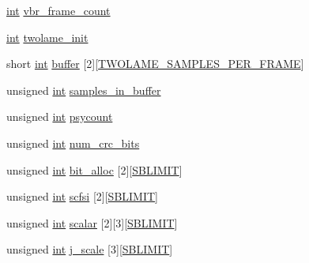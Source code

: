 \begin{DoxyCompactItemize}
\hyperlink{xmltok_8h_a5a0d4a5641ce434f1d23533f2b2e6653}{int} \hyperlink{structtwolame__options__struct_ab9e79c1f1ef2b4cedca215aaeb77a4b2}{vbr\+\_\+frame\+\_\+count}
\item 
\hyperlink{xmltok_8h_a5a0d4a5641ce434f1d23533f2b2e6653}{int} \hyperlink{structtwolame__options__struct_a205bb93e39b37ed46fddf5bbca9fdfc4}{twolame\+\_\+init}
\item 
short \hyperlink{xmltok_8h_a5a0d4a5641ce434f1d23533f2b2e6653}{int} \hyperlink{structtwolame__options__struct_a032502082a28f2c52a3d7eaafff3bb7b}{buffer} \mbox{[}2\mbox{]}\mbox{[}\hyperlink{twolame_8h_a09bd4a4970ba3c49e9f1327daefeb8c1}{T\+W\+O\+L\+A\+M\+E\+\_\+\+S\+A\+M\+P\+L\+E\+S\+\_\+\+P\+E\+R\+\_\+\+F\+R\+A\+ME}\mbox{]}
\item 
unsigned \hyperlink{xmltok_8h_a5a0d4a5641ce434f1d23533f2b2e6653}{int} \hyperlink{structtwolame__options__struct_ac913af8a949f16c73ddab30d6b79492c}{samples\+\_\+in\+\_\+buffer}
\item 
unsigned \hyperlink{xmltok_8h_a5a0d4a5641ce434f1d23533f2b2e6653}{int} \hyperlink{structtwolame__options__struct_a7effec5229bce5662be57b47b6b212f8}{psycount}
\item 
unsigned \hyperlink{xmltok_8h_a5a0d4a5641ce434f1d23533f2b2e6653}{int} \hyperlink{structtwolame__options__struct_a6efe63477b890f1ab423e82cd6c65bf0}{num\+\_\+crc\+\_\+bits}
\item 
unsigned \hyperlink{xmltok_8h_a5a0d4a5641ce434f1d23533f2b2e6653}{int} \hyperlink{structtwolame__options__struct_a8eaa31d1aa907911c5ebf55a4e654ba8}{bit\+\_\+alloc} \mbox{[}2\mbox{]}\mbox{[}\hyperlink{twolame_2libtwolame_2common_8h_aae2d5a401c55c6b2b834c99340911fdb}{S\+B\+L\+I\+M\+IT}\mbox{]}
\item 
unsigned \hyperlink{xmltok_8h_a5a0d4a5641ce434f1d23533f2b2e6653}{int} \hyperlink{structtwolame__options__struct_a6ea70e1aff6609b6451dfe9c98cbaa51}{scfsi} \mbox{[}2\mbox{]}\mbox{[}\hyperlink{twolame_2libtwolame_2common_8h_aae2d5a401c55c6b2b834c99340911fdb}{S\+B\+L\+I\+M\+IT}\mbox{]}
\item 
unsigned \hyperlink{xmltok_8h_a5a0d4a5641ce434f1d23533f2b2e6653}{int} \hyperlink{structtwolame__options__struct_a0e8c6e8c13d9e78799d794674514d0b4}{scalar} \mbox{[}2\mbox{]}\mbox{[}3\mbox{]}\mbox{[}\hyperlink{twolame_2libtwolame_2common_8h_aae2d5a401c55c6b2b834c99340911fdb}{S\+B\+L\+I\+M\+IT}\mbox{]}
\item 
unsigned \hyperlink{xmltok_8h_a5a0d4a5641ce434f1d23533f2b2e6653}{int} \hyperlink{structtwolame__options__struct_aba04b12dc6567e0f23cdbd5993adfd43}{j\+\_\+scale} \mbox{[}3\mbox{]}\mbox{[}\hyperlink{twolame_2libtwolame_2common_8h_aae2d5a401c55c6b2b834c99340911fdb}{S\+B\+L\+I\+M\+IT}\mbox{]}

\end{DoxyCompactItemize}
